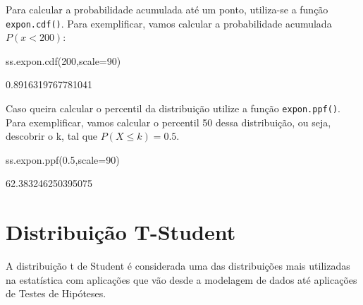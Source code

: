 \documentclass[
  letterpaper,
  DIV=11,
  numbers=noendperiod]{scrreprt}
\newenvironment{Shaded}{\begin{snugshade}}{\end{snugshade}}
\newcommand{\DecValTok}[1]{\textcolor[rgb]{0.68,0.00,0.00}{#1}}
\newcommand{\FloatTok}[1]{\textcolor[rgb]{0.68,0.00,0.00}{#1}}
\newcommand{\NormalTok}[1]{\textcolor[rgb]{0.00,0.23,0.31}{#1}}
\newcommand{\OperatorTok}[1]{\textcolor[rgb]{0.37,0.37,0.37}{#1}}
\begin{document}
Para calcular a probabilidade acumulada até um ponto, utiliza-se a
função \texttt{expon.cdf()}. Para exemplificar, vamos calcular a
probabilidade acumulada \(P(x< 200)\):

\begin{Shaded}
\begin{Highlighting}[]
\NormalTok{ss.expon.cdf(}\DecValTok{200}\NormalTok{,scale}\OperatorTok{=}\DecValTok{90}\NormalTok{)}
\end{Highlighting}
\end{Shaded}

\begin{tcolorbox}[enhanced jigsaw, breakable, leftrule=.75mm, left=2mm, opacityback=0, bottomrule=.15mm, toprule=.15mm, rightrule=.15mm, arc=.35mm, colback=white]

0.8916319767781041

\end{tcolorbox}

Caso queira calcular o percentil da distribuição utilize a função
\texttt{expon.ppf()}. Para exemplificar, vamos calcular o percentil 50
dessa distribuição, ou seja, descobrir o k, tal que \(P(X≤k)=0.5\).

\begin{Shaded}
\begin{Highlighting}[]
\NormalTok{ss.expon.ppf(}\FloatTok{0.5}\NormalTok{,scale}\OperatorTok{=}\DecValTok{90}\NormalTok{)}
\end{Highlighting}
\end{Shaded}

\begin{tcolorbox}[enhanced jigsaw, breakable, leftrule=.75mm, left=2mm, opacityback=0, bottomrule=.15mm, toprule=.15mm, rightrule=.15mm, arc=.35mm, colback=white]

62.383246250395075

\end{tcolorbox}


\hypertarget{distribuiuxe7uxe3o-t-student}{%
\chapter{Distribuição T-Student}\label{distribuiuxe7uxe3o-t-student}}

A distribuição t de Student é considerada uma das distribuições mais
utilizadas na estatística com aplicações que vão desde a modelagem de
dados até aplicações de Testes de Hipóteses.
\end{document}
